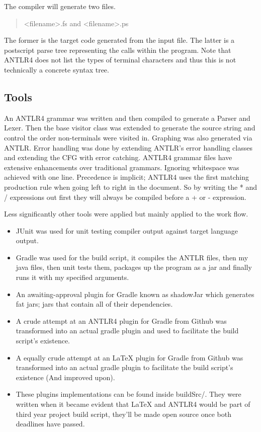 \documentclass[a4paper,12pt]{article}
\begin{document}
\begin{landscape}
\begin{quotation}
\end{quotation}

The compiler will generate two files. 
\begin{quotation}
<filename>.fs and <filename>.ps
\end{quotation}
The former is the target code generated from the input file. The latter is a postscript parse tree representing the calls within the program. Note that ANTLR4 does not list the types of terminal characters and thus this is not technically a concrete syntax tree.

\end{landscape}
\subsection{Tools}
An ANTLR4 grammar was written and then compiled to generate a Parser and Lexer. Then the base visitor class was extended to generate the source string and control the order non-terminals were visited in. Graphing was also generated via ANTLR. Error handling was done by extending ANTLR's error handling classes and extending the \gls{CFG} with error catching. ANTLR4 grammar files have extensive enhancements over traditional grammars. Ignoring whitespace was achieved with one
line. Precedence is implicit; ANTLR4 uses the first matching production rule when going left to right in the document. So by writing the * and / expressions out first they will always be compiled before a + or - expression.

Less significantly other tools were applied but mainly applied to the work flow. 
\begin{itemize}
    \item JUnit was used for unit testing compiler output against target language output.
    \item Gradle was used for the build script, it compiles the ANTLR files, then my java files, then unit tests them, packages up the program as a jar and finally runs it with my specified arguments. 
    \item An awaiting-approval plugin for Gradle known as shadowJar which generates fat jars; jars that contain all of their dependencies.
    \item A crude attempt at an ANTLR4 plugin for Gradle from Github was transformed into an actual gradle plugin and used to facilitate the build script's existence.
    \item A equally crude attempt at an LaTeX plugin for Gradle from Github was transformed into an actual gradle plugin to facilitate the build script's existence (And improved upon).
    \item These plugins implementations can be found inside buildSrc/. They were written when it became evident that LaTeX and ANTLR4 would be part of third year project build script, they'll be made open source once both deadlines have passed.
\end{itemize}
\end{document}
